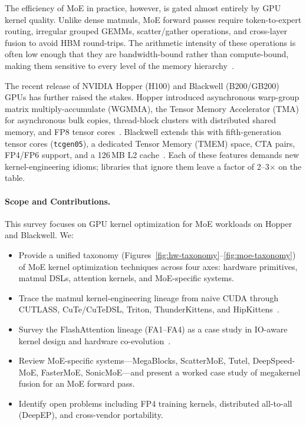 \documentclass[10pt]{article}
\begin{document}
The efficiency of MoE in practice, however, is gated almost entirely by GPU kernel quality. Unlike dense matmuls, MoE forward passes require token-to-expert routing, irregular grouped GEMMs, scatter/gather operations, and cross-layer fusion to avoid HBM round-trips. The arithmetic intensity of these operations is often low enough that they are bandwidth-bound rather than compute-bound, making them sensitive to every level of the memory hierarchy~\citep{dao2022flashattention,gale2023megablocks}.

The recent release of NVIDIA Hopper (H100) and Blackwell (B200/GB200) GPUs has further raised the stakes. Hopper introduced asynchronous warp-group matrix multiply-accumulate (WGMMA), the Tensor Memory Accelerator (TMA) for asynchronous bulk copies, thread-block clusters with distributed shared memory, and FP8 tensor cores~\citep{nvidia2022hopper}. Blackwell extends this with fifth-generation tensor cores (\texttt{tcgen05}), a dedicated Tensor Memory (TMEM) space, CTA pairs, FP4/FP6 support, and a 126\,MB L2 cache~\citep{nvidia2024blackwell}. Each of these features demands new kernel-engineering idioms; libraries that ignore them leave a factor of 2--3$\times$ on the table.

\paragraph{Scope and Contributions.} This survey focuses on GPU kernel optimization for MoE workloads on Hopper and Blackwell. We:
\begin{itemize}
    \item Provide a unified taxonomy (Figures~\ref{fig:hw-taxonomy}--\ref{fig:moe-taxonomy}) of MoE kernel optimization techniques across four axes: hardware primitives, matmul DSLs, attention kernels, and MoE-specific systems.
    \item Trace the matmul kernel-engineering lineage from naive CUDA through CUTLASS, CuTe/CuTeDSL, Triton, ThunderKittens, and HipKittens~\citep{thakkar2023cutlass,tillet2019triton,spector2024thunderkittens,hipkittens2025}.
    \item Survey the FlashAttention lineage (FA1--FA4) as a case study in IO-aware kernel design and hardware co-evolution~\citep{dao2022flashattention,dao2023flashattention2,shah2024flashattention3,flashattention4}.
    \item Review MoE-specific systems---MegaBlocks, ScatterMoE, Tutel, DeepSpeed-MoE, FasterMoE, SonicMoE---and present a worked case study of megakernel fusion for an MoE forward pass.
    \item Identify open problems including FP4 training kernels, distributed all-to-all (DeepEP), and cross-vendor portability.
\end{itemize}
\end{document}

